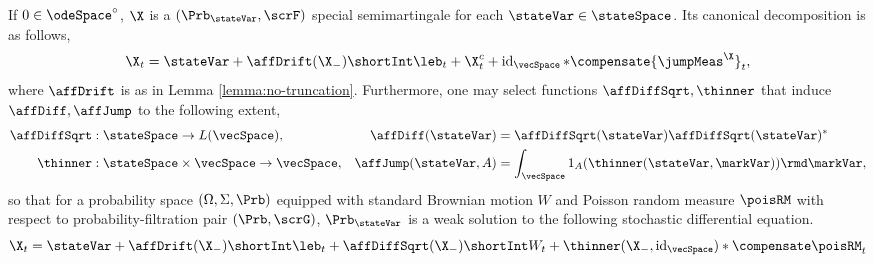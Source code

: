 \begin{theorem}
  \label{theorem:jump-diffusion}
  If $0 \in \odeSpace^\circ$, $\X$ is a $(\Prb_\stateVar, \scrF)$ special semimartingale for each $\stateVar \in \stateSpace$.
  Its canonical decomposition is as follows,
  \begin{equation}
    \X_t = \stateVar + \affDrift(\X_-) \shortInt \leb_t + \X^c_t + \operatorname{id}_\vecSpace \ast \compensate{\jumpMeas^\X}_t,
  \end{equation}
  where $\affDrift$ is as in Lemma \ref{lemma:no-truncation}.
  Furthermore, one may select functions $\affDiffSqrt, \thinner$ that induce $\affDiff, \affJump$ to the following extent,
  \begin{align}
    \label{eq:affDiffSqrt}
    \affDiffSqrt&: \stateSpace \rightarrow L(\vecSpace), 
    & \affDiff(\stateVar) &= \affDiffSqrt(\stateVar)\affDiffSqrt(\stateVar)^* \\
    \label{eq:thinner}
    \thinner&: \stateSpace \times \vecSpace \rightarrow \vecSpace,
    & \affJump(\stateVar, A) &= \int_\vecSpace 1_A(\thinner(\stateVar,\markVar)) \rmd\markVar,
  \end{align}
  so that for a probability space $(\Omega, \Sigma, \Prb)$ equipped with standard Brownian motion $W$ and Poisson random measure $\poisRM$ with respect to probability-filtration pair $(\Prb, \scrG)$, $\Prb_\stateVar$ is a weak solution to the following stochastic differential equation.
  \begin{equation}
    \label{eq:dynamics}
    \X_t = \stateVar + \affDrift(\X_-) \shortInt \leb_t + \affDiffSqrt(\X_-) \shortInt W_t + \thinner(\X_-, \operatorname{id}_\vecSpace) \ast \compensate\poisRM_t
  \end{equation}
\end{theorem}
